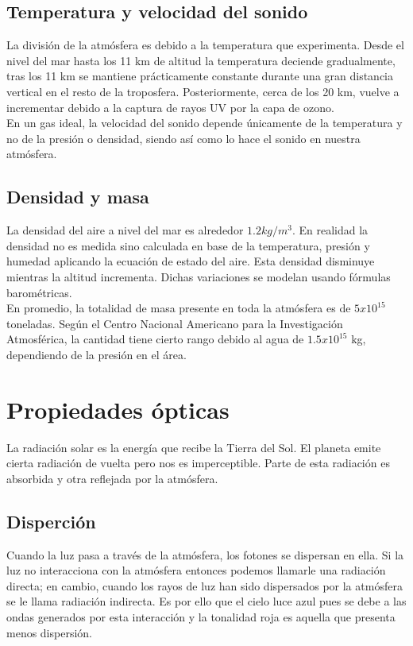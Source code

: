 \subsection{Temperatura y velocidad del sonido}
La división de la atmósfera es debido a la temperatura que experimenta.
Desde el nivel del mar hasta los 11 km de altitud la temperatura deciende
gradualmente, tras los 11 km se mantiene prácticamente constante durante
una gran distancia vertical en el resto de la troposfera. Posteriormente,
cerca de los 20 km, vuelve a incrementar debido a la captura de rayos UV
por la capa de ozono.
\\[3mm] En un gas ideal, la velocidad del sonido depende únicamente de
la temperatura y no de la presión o densidad, siendo así como lo hace
el sonido en nuestra atmósfera.

\subsection{Densidad y masa}
La densidad del aire a nivel del mar es alrededor $1.2 kg/m^{3}$.
En realidad la densidad no es medida sino calculada en base de la
temperatura, presión y humedad aplicando la ecuación de estado del
aire. Esta densidad disminuye mientras la altitud incrementa. Dichas
variaciones se modelan usando fórmulas barométricas.
\\[3mm] En promedio, la totalidad de masa presente en toda la
atmósfera es de $5x10^{15}$ toneladas. Según el Centro Nacional
Americano para la Investigación Atmosférica, la cantidad tiene
cierto rango debido al agua de $1.5x10^{15}$ kg, dependiendo de
la presión en el área.

\section{Propiedades ópticas}
La radiación solar es la energía que recibe la Tierra del Sol. El
planeta emite cierta radiación de vuelta pero nos es imperceptible.
Parte de esta radiación es absorbida y otra reflejada por la atmósfera.

\subsection{Disperción}
Cuando la luz pasa a través de la atmósfera, los fotones se dispersan
en ella. Si la luz no interacciona con la atmósfera entonces podemos
llamarle una radiación directa; en cambio, cuando los rayos de luz
han sido dispersados por la atmósfera se le llama radiación indirecta.
Es por ello que el cielo luce azul pues se debe a las ondas generados
por esta interacción y la tonalidad roja es aquella que presenta menos
dispersión.

